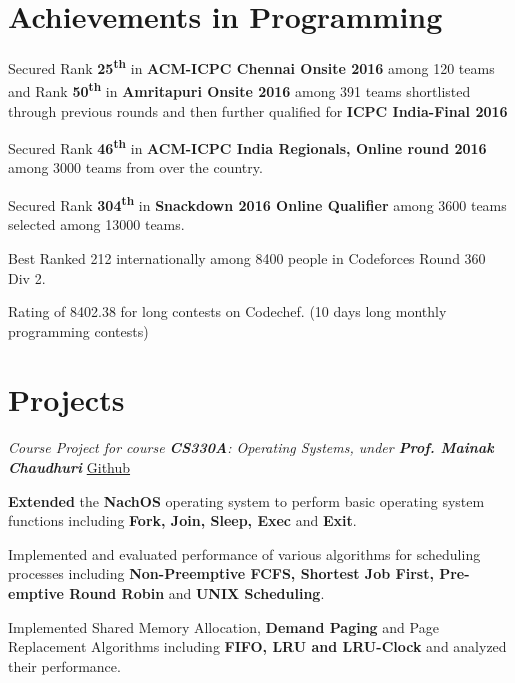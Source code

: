 \documentclass[a4paper]{norm-resume}
\begin{document}

\section{Achievements in Programming \hrulefill}

\vspace{2mm} %

\begin{tightitemize}
    \item Secured Rank \textbf{25\textsuperscript{th}} in \textbf{ACM-ICPC Chennai Onsite 2016} among 120 teams and Rank \textbf{50\textsuperscript{th}} in \textbf{Amritapuri Onsite 2016} among 391 teams shortlisted through previous rounds and then further qualified for \textbf{ICPC India-Final 2016}
    \item Secured Rank \textbf{46\textsuperscript{th}} in \textbf{ACM-ICPC India Regionals, Online round 2016} among 3000 teams from over the country.
    \item Secured Rank \textbf{304\textsuperscript{th}} in \textbf{Snackdown 2016 Online Qualifier} among 3600 teams selected among 13000 teams.
    \item Best Ranked 212 internationally among 8400 people in Codeforces Round 360 Div 2.
	\item Rating of 8402.38 for long contests on Codechef. (10 days long monthly programming contests)
\end{tightitemize}


\section{Projects \hrulefill}


       
    \emph{Course Project for course \textbf{CS330A}: Operating Systems, under \textbf{Prof. Mainak Chaudhuri}} \hfill \small \href{https://github.com/sakshamsharma/cs330assignments}{Github}
    \vspace{1mm}
    \begin{tightitemize}
    \small
    {
    \item \textbf{Extended} the \textbf{NachOS} operating system to perform basic operating system functions including \textbf{Fork, Join, Sleep, Exec} and \textbf{Exit}.
    \item Implemented and evaluated performance of various algorithms for scheduling processes including \textbf{Non-Preemptive FCFS, Shortest Job First, Pre-emptive Round Robin} and \textbf{UNIX Scheduling}.
    \item Implemented Shared Memory Allocation, \textbf{Demand Paging} and Page Replacement Algorithms including \textbf{FIFO, LRU and LRU-Clock} and analyzed their performance.
    }
    \end{tightitemize}
\end{document}
